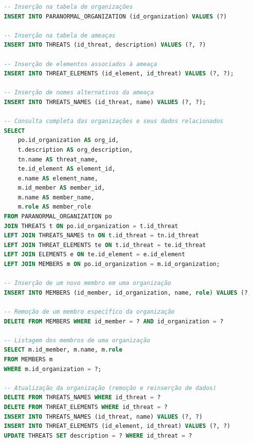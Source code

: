 \documentclass[12pt,a4paper]{report}
\begin{document}
\begin{lstlisting}[language=SQL, caption=Consultas feitas em OrganizationDAO]
-- Inserção na tabela de organizações
INSERT INTO PARANORMAL_ORGANIZATION (id_organization) VALUES (?)

-- Inserção na tabela de ameaças
INSERT INTO THREATS (id_threat, description) VALUES (?, ?)

-- Inserção de elementos associados à ameaça
INSERT INTO THREAT_ELEMENTS (id_element, id_threat) VALUES (?, ?);

-- Inserção de nomes alternativos da ameaça
INSERT INTO THREATS_NAMES (id_threat, name) VALUES (?, ?);

-- Consulta completa das organizações e seus dados relacionados
SELECT 
    po.id_organization AS org_id,
    t.description AS org_description,
    tn.name AS threat_name,
    te.id_element AS element_id,
    e.name AS element_name,
    m.id_member AS member_id,
    m.name AS member_name,
    m.role AS member_role
FROM PARANORMAL_ORGANIZATION po
JOIN THREATS t ON po.id_organization = t.id_threat
LEFT JOIN THREATS_NAMES tn ON t.id_threat = tn.id_threat
LEFT JOIN THREAT_ELEMENTS te ON t.id_threat = te.id_threat
LEFT JOIN ELEMENTS e ON te.id_element = e.id_element
LEFT JOIN MEMBERS m ON po.id_organization = m.id_organization;

-- Inserção de um novo membro em uma organização
INSERT INTO MEMBERS (id_member, id_organization, name, role) VALUES (?, ?, ?, ?)

-- Remoção de um membro específico da organização
DELETE FROM MEMBERS WHERE id_member = ? AND id_organization = ?

-- Listagem dos membros de uma organização
SELECT m.id_member, m.name, m.role
FROM MEMBERS m
WHERE m.id_organization = ?;

-- Atualização da organização (remoção e reinserção de dados)
DELETE FROM THREATS_NAMES WHERE id_threat = ?
DELETE FROM THREAT_ELEMENTS WHERE id_threat = ?
INSERT INTO THREATS_NAMES (id_threat, name) VALUES (?, ?)
INSERT INTO THREAT_ELEMENTS (id_element, id_threat) VALUES (?, ?)
UPDATE THREATS SET description = ? WHERE id_threat = ?
\end{lstlisting}
\end{document}

